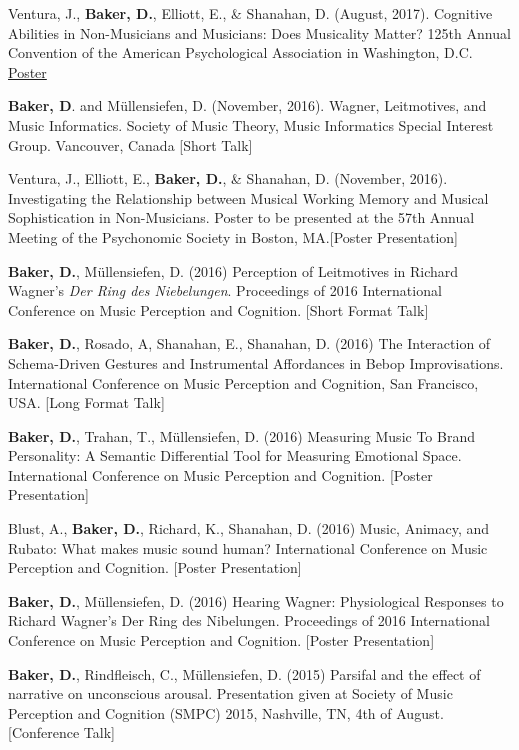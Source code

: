 Ventura, J., \textbf{Baker, D.}, Elliott, E., \& Shanahan, D. (August, 2017). Cognitive Abilities in Non-Musicians and Musicians: Does Musicality Matter? 125th Annual Convention of the American Psychological Association in Washington, D.C. \href{https://musiccog.lsu.edu/lab_posters/APA2017_poster.pdf}{Poster}

\textbf{Baker, D}. and M\"{u}llensiefen, D. (November, 2016). Wagner, Leitmotives, and Music Informatics. Society of Music Theory, Music Informatics Special Interest Group. Vancouver, Canada [Short Talk] 

Ventura, J., Elliott, E., \textbf{Baker, D.}, \& Shanahan, D. (November, 2016). Investigating the Relationship between Musical Working Memory and Musical Sophistication in Non-Musicians. Poster to be presented at the 57th Annual Meeting of the Psychonomic Society in Boston, MA.[Poster Presentation]

\textbf{Baker, D.}, M\"{u}llensiefen, D. (2016) Perception of Leitmotives in Richard Wagner's \emph{Der Ring des Niebelungen}. Proceedings of 2016 International Conference on Music Perception and Cognition. [Short Format Talk]

\textbf{Baker, D.}, Rosado, A, Shanahan, E., Shanahan, D. (2016) The Interaction of Schema-Driven Gestures and Instrumental Affordances in Bebop Improvisations. International Conference on Music Perception and Cognition, San Francisco, USA. [Long Format Talk]

\textbf{Baker, D.}, Trahan, T., M\"{u}llensiefen, D. (2016) Measuring Music To Brand Personality: A Semantic Differential Tool for Measuring Emotional Space. International Conference on Music Perception and Cognition. [Poster Presentation]

Blust, A., \textbf{Baker, D.}, Richard, K., Shanahan, D. (2016) Music, Animacy, and Rubato: What makes music sound human? International Conference on Music Perception and Cognition. [Poster Presentation]

\textbf{Baker, D.}, M\"{u}llensiefen, D. (2016) Hearing Wagner: Physiological Responses to Richard Wagner’s Der Ring des Nibelungen. Proceedings of 2016 International Conference on Music Perception and Cognition. [Poster Presentation]

\textbf{Baker, D.}, Rindfleisch, C., M\"{u}llensiefen, D. (2015) Parsifal and the effect of narrative on unconscious arousal. Presentation given at Society of Music Perception and Cognition (SMPC) 2015, Nashville, TN, 4th of August. [Conference Talk]

